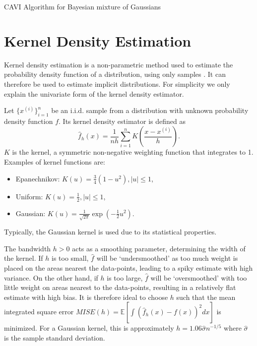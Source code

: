 \documentclass[honours,12pt]{unswthesis}
\newcommand{\E}{\mathbb{E}}
\numberwithin{equation}{section}
\theoremstyle{definition}
\begin{document}
\begin{algorithm}
\caption{CAVI Algorithm for Bayesian mixture of Gaussians}
\BlankLine
{}
\label{alg:9}
\end{algorithm}
\newpage
\chapter{Kernel Density Estimation}\label{app:D}
Kernel density estimation is a non-parametric method used to estimate the probability density function of a distribution, using only samples \citep{kde}. It can therefore be used to estimate implicit distributions. For simplicity we only explain the univariate form of the kernel density estimator.

Let $\{x^{(i)}\}^n_{i=1}$ be an i.i.d. sample from a distribution with unknown probability density function $f$. Its kernel density estimator is defined as
\[\hat{f}_h(x)=\frac{1}{nh}\sum^n_{i=1}K\left(\frac{x-x^{(i)}}{h}\right).\]
$K$ is the kernel, a symmetric non-negative weighting function that integrates to 1. Examples of kernel functions are:
\begin{itemize}
\item Epanechnikov: $K(u)=\frac{3}{4}(1-u^2), |u|\leq 1$,
\item Uniform: $K(u)=\frac12, |u|\leq 1$,
\item Gaussian: $K(u)=\frac{1}{\sqrt{2\pi}}\exp\left(-\frac{1}{2}u^2\right)$.
\end{itemize}
Typically, the Gaussian kernel is used due to its statistical properties.

The bandwidth $h>0$ acts as a smoothing parameter, determining the width of the kernel. If $h$ is too small, $\hat{f}$ will be `undersmoothed' as too much weight is placed on the areas nearest the data-points, leading to a spiky estimate with high variance. On the other hand, if $h$ is too large, $\hat{f}$ will be `oversmoothed' with too little weight on areas nearest to the data-points, resulting in a relatively flat estimate with high bias. It is therefore ideal to choose $h$ such that the mean integrated square error $MISE(h)=\E\left[\int(\hat{f}_h(x)-f(x))^2dx\right]$ is minimized. For a Gaussian kernel, this is approximately $h=1.06\hat{\sigma}n^{-1/5}$ where $\hat{\sigma}$ is the sample standard deviation.
\end{document}
